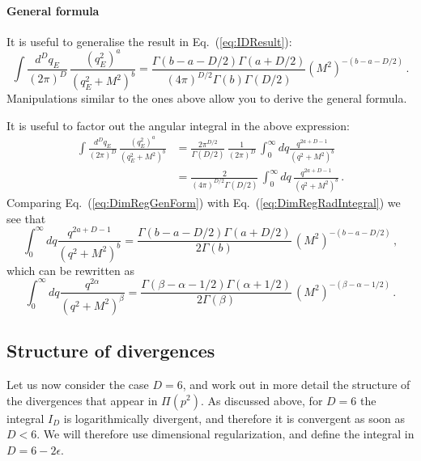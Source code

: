 \paragraph{General formula}

It is useful to generalise the result in Eq.~(\ref{eq:IDResult}):
\begin{equation}
  \label{eq:DimRegGenForm}
  \boxed{
  \int \frac{d^Dq_E}{(2\pi)^D}\,
  \frac{\left(q_E^2\right)^a}{\left(q_E^2+M^2\right)^b}
  = \frac{\Gamma(b-a-D/2) \Gamma(a+D/2)}{(4\pi)^{D/2} \Gamma(b)
  \Gamma(D/2)} \left(M^2\right)^{-(b-a-D/2)}\, .}
\end{equation}
Manipulations similar to the ones above allow you to derive the
general formula.

\noindent
It is useful to factor out the angular integral in the above expression: 
\begin{align}
  \int \frac{d^Dq_E}{(2\pi)^D}\,
  \frac{\left(q_E^2\right)^a}{\left(q_E^2+M^2\right)^b}
  &= \frac{2\pi^{D/2}}{\Gamma(D/2)}\, \frac{1}{(2\pi)^D}\,
  \int_0^\infty dq \frac{q^{2a+D-1}}{(q^2+M^2)^b} \\
  \label{eq:DimRegRadIntegral}
  &= \frac{2}{(4\pi)^{D/2} \Gamma(D/2)}\, 
  \int_0^\infty dq\, \frac{q^{2a+D-1}}{(q^2+M^2)^b} \, .
\end{align}
Comparing Eq.~(\ref{eq:DimRegGenForm}) with Eq.~(\ref{eq:DimRegRadIntegral}) we see that
\begin{equation}
  \int_0^\infty dq \frac{q^{2a+D-1}}{(q^2+M^2)^b} 
    = \frac{\Gamma(b-a-D/2)\Gamma(a+D/2)}{2 \Gamma(b)}\, 
      (M^2)^{-(b-a-D/2)}\, ,
\end{equation}
which can be rewritten as
\begin{equation}
  \label{eq:DimRegRadIntFormula}
  \boxed{
  \int_0^\infty dq \frac{q^{2\alpha}}{(q^2+M^2)^\beta} 
    = \frac{\Gamma(\beta-\alpha-1/2)\Gamma(\alpha+1/2)}{2 \Gamma(\beta)}\, 
      (M^2)^{-(\beta-\alpha-1/2)}\, .
  }
\end{equation}


\subsection{Structure of divergences}
\label{sec:struct-diverg}

Let us now consider the case $D=6$, and work out in more detail the
structure of the divergences that appear in $\Pi(p^2)$. As discussed
above, for $D=6$ the integral $I_D$ is logarithmically divergent, and
therefore it is convergent as soon as $D<6$. We will therefore use
dimensional regularization, and define the integral in
$D=6-2\epsilon$.

